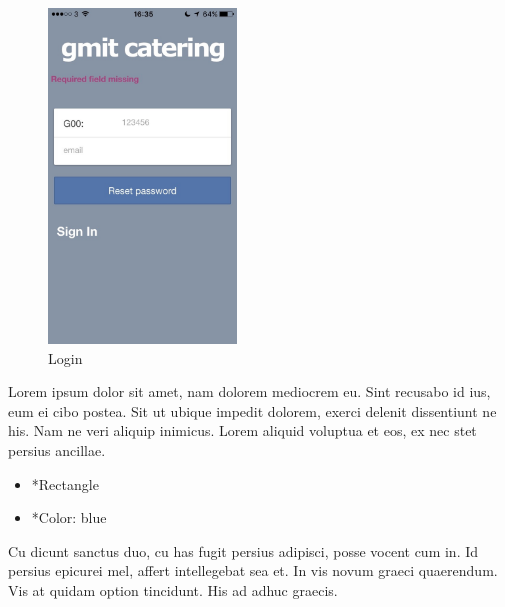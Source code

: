 \begin{minipage}{5cm}
	\begin{figure}[H]
		\includegraphics[width=5cm]{img/mobile-app/screen-shots/IMG_2905.jpg}
		\caption{Login}
	\end{figure}
\end{minipage} \hfill
\begin{minipage}{0.55\textwidth}
		Lorem ipsum dolor sit amet, nam dolorem mediocrem eu. Sint recusabo id ius, eum ei cibo postea. Sit ut ubique impedit dolorem, exerci delenit dissentiunt ne his. Nam ne veri aliquip inimicus. Lorem aliquid voluptua et eos, ex nec stet persius ancillae.
	\begin{itemize}
		\item *Rectangle
		\item *Color: blue
	\end{itemize}
	Cu dicunt sanctus duo, cu has fugit persius adipisci, posse vocent cum in. Id persius epicurei mel, affert intellegebat sea et. In vis novum graeci quaerendum. Vis at quidam option tincidunt. His ad adhuc graecis.
\end{minipage}

